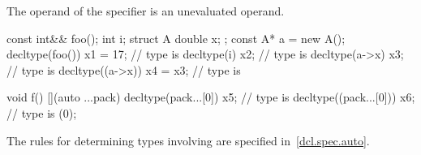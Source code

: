 The operand of the  specifier is an unevaluated
operand.

\begin{example}
\begin{codeblock}
const int&& foo();
int i;
struct A { double x; };
const A* a = new A();
decltype(foo()) x1 = 17;        // type is 
decltype(i) x2;                 // type is 
decltype(a->x) x3;              // type is 
decltype((a->x)) x4 = x3;       // type is 

void f() {
  [](auto ...pack) {
    decltype(pack...[0]) x5;    // type is 
    decltype((pack...[0])) x6;  // type is 
  }(0);
}
\end{codeblock}
\end{example}
\begin{note}
The rules for determining types involving  are specified
in~\ref{dcl.spec.auto}.
\end{note}

